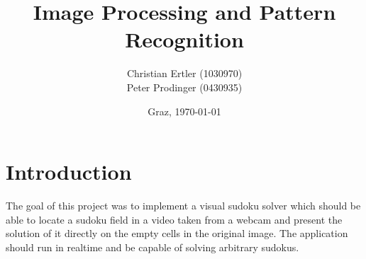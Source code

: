\documentclass[
a4paper,     %
12pt         %
]{scrartcl}  %
\title{Image Processing and Pattern Recognition}
\author{Christian Ertler (1030970) \\ Peter Prodinger (0430935)}
\date{Graz, \today{}}
\begin{document}
\maketitle









\section{Introduction}

The goal of this project was to implement a visual sudoku solver which should be able
to locate a sudoku field in a video taken from a webcam and present the solution of it
directly on the empty cells in the original image. The application should run in realtime
and be capable of solving arbitrary sudokus. 

\end{document}
